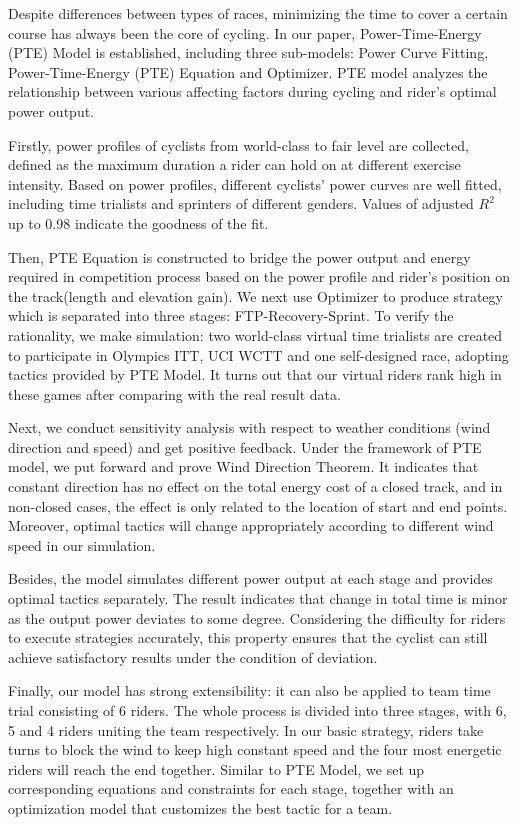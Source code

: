\par Despite differences between types of races, minimizing the time to cover a certain course has always been the core of cycling. In our paper, Power-Time-Energy (PTE) Model is established, including three sub-models: Power Curve Fitting, Power-Time-Energy (PTE) Equation and Optimizer. PTE model analyzes the relationship between various affecting factors during cycling and rider's optimal power output.

\par Firstly, power profiles of cyclists from world-class to fair level are collected, defined as the maximum duration a rider can hold on at different exercise intensity. Based on power profiles, different cyclists' power curves are well fitted, including time trialists and sprinters of different genders. Values of adjusted $R^2$ up to 0.98 indicate the goodness of the fit.

\par Then, PTE Equation is constructed to bridge the power output and energy required in competition process based on the power profile and rider's position on the track(length and elevation gain). We next use Optimizer to produce strategy which is separated into three stages: FTP-Recovery-Sprint. To verify the rationality, we make simulation: two world-class virtual time trialists are created to participate in Olympics ITT, UCI WCTT and one self-designed race, adopting tactics provided by PTE Model. It turns out that our virtual riders rank high in these games after comparing with the real result data.

\par Next, we conduct sensitivity analysis with respect to weather conditions (wind direction and speed) and get positive feedback. Under the framework of PTE model, we put forward and prove Wind Direction Theorem. It indicates that constant direction has no effect on the total energy cost of a closed track, and in non-closed cases, the effect is only related to the location of start and end points. Moreover, optimal tactics will change appropriately according to different wind speed in our simulation.

\par Besides, the model simulates different power output at each stage and provides optimal tactics separately. The result indicates that change in total time is minor as the output power deviates to some degree. Considering the difficulty for riders to execute strategies accurately, this property ensures that the cyclist can still achieve satisfactory results under the condition of deviation.

\par Finally, our model has strong extensibility: it can also be applied to team time trial consisting of 6 riders. The whole process is divided into three stages, with 6, 5 and 4 riders uniting the team respectively. In our basic strategy, riders take turns to block the wind to keep high constant speed and the four most energetic riders will reach the end together. Similar to PTE Model, we set up corresponding equations and constraints for each stage, together with an optimization model that customizes the best tactic for a team.

 